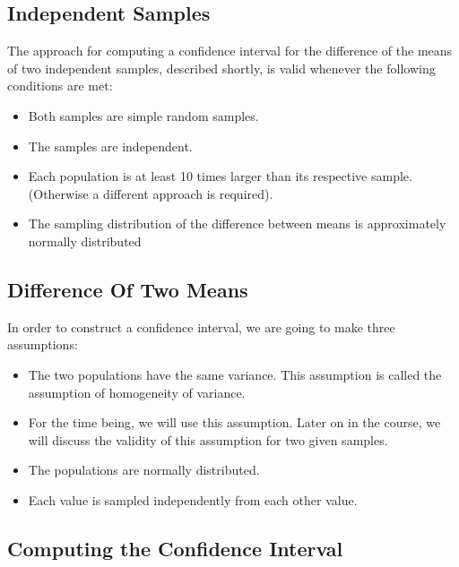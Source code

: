 \documentclass[a4paper,12pt]{article}
\begin{document}
\subsection*{Independent Samples}

The approach for computing a confidence interval for the difference of the means of two independent samples,  described shortly, is valid whenever the following conditions are met:

\begin{itemize}
\item Both samples are simple random samples.
\item The samples are independent.
\item Each population is at least 10 times larger than its respective sample. (Otherwise a different approach is required).
\item The sampling distribution of the difference between means is approximately normally distributed
\end{itemize}




\subsection*{Difference Of Two Means}
In order to construct a confidence interval, we are going to make three assumptions:

\begin{itemize}
\item The two populations have the same variance. This assumption is called the assumption of homogeneity of variance.
\item For the time being, we will use this assumption. Later on in the course, we will discuss the validity of this assumption for two given samples.
\item The populations are normally distributed.
\item Each value is sampled independently from each other value.
\end{itemize}



\subsection*{Computing the Confidence Interval}
\end{document}
